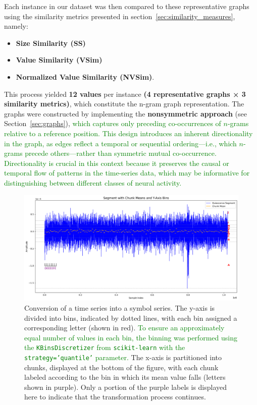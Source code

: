\documentclass{article}
\begin{document}
Each instance in our dataset was then compared to these representative graphs using the similarity metrics presented in section~\ref{sec:similarity_measures}, namely:
\begin{itemize}
    \item \textbf{Size Similarity (SS)}
    \item \textbf{Value Similarity (VSim)}
    \item \textbf{Normalized Value Similarity (NVSim)}. 
\end{itemize}    
This process yielded \textbf{12 values} per instance \textbf{(4 representative graphs × 3 similarity metrics)}, which constitute the n-gram graph representation. The graphs were constructed by implementing the \textbf{nonsymmetric approach} (see Section~\ref{sec:graphs}), \textcolor{green}{which captures only preceding co-occurrences of $n$-grams relative to a reference position. This design introduces an inherent directionality in the graph, as edges reflect a temporal or sequential ordering—i.e., which $n$-grams precede others—rather than symmetric mutual co-occurrence. Directionality is crucial in this context because it preserves the causal or temporal flow of patterns in the time-series data, which may be informative for distinguishing between different classes of neural activity.}

\begin{figure}[htbp]
    \centering
    \includegraphics[width=\linewidth]{graph_binning_with_chunks_high_res1_ready.png}
    \caption{Conversion of a time series into a symbol series. The y-axis is divided into bins, indicated by dotted lines, with each bin assigned a corresponding letter (shown in red). \textcolor{green}{To ensure an approximately equal number of values in each bin, the binning was performed using the \texttt{KBinsDiscretizer} from \texttt{scikit-learn} with the \texttt{strategy='quantile'} parameter.} The x-axis is partitioned into chunks, displayed at the bottom of the figure, with each chunk labeled according to the bin in which its mean value falls (letters shown in purple). Only a portion of the purple labels is displayed here to indicate that the transformation process continues.}
    \label{fig:binning}
\end{figure}
\end{document}
